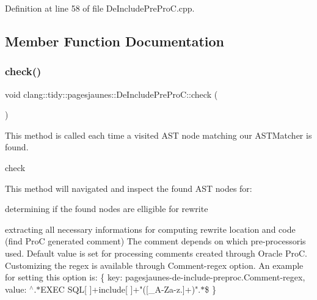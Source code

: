 Definition at line 58 of file De\+Include\+Pre\+Pro\+C.\+cpp.



\subsection{Member Function Documentation}
\mbox{\label{classclang_1_1tidy_1_1pagesjaunes_1_1_de_include_pre_pro_c_ab9a11b66717687f7260093f83304fe33}} 
\subsubsection{\texorpdfstring{check()}{check()}}
{\footnotesize\ttfamily void clang\+::tidy\+::pagesjaunes\+::\+De\+Include\+Pre\+Pro\+C\+::check (\begin{DoxyParamCaption}\item[{const ast\+\_\+matchers\+::\+Match\+Finder\+::\+Match\+Result \&}]{ }\end{DoxyParamCaption})\hspace{0.3cm}{\ttfamily [override]}}



This method is called each time a visited A\+ST node matching our A\+S\+T\+Matcher is found. 

check

This method will navigated and inspect the found A\+ST nodes for\+:
\begin{DoxyItemize}
\item determining if the found nodes are elligible for rewrite
\item extracting all necessary informations for computing rewrite location and code (find ProC generated comment) The comment depends on which pre-\/processoris used. Default value is set for processing comments created through Oracle ProC. Customizing the regex is available through {\ttfamily Comment-\/regex} option. An example for setting this option is\+: \{ key\+: pagesjaunes-\/de-\/include-\/preproc.\+Comment-\/regex, value\+: \textquotesingle{}$^\wedge$.$\ast$\+E\+X\+EC S\+QL\mbox{[} \mbox{]}+include\mbox{[} \mbox{]}+"(\mbox{[}\+\_\+\+A-\/\+Za-\/z.\mbox{]}+)".$\ast$\$\textquotesingle{} \}
\end{DoxyItemize}


